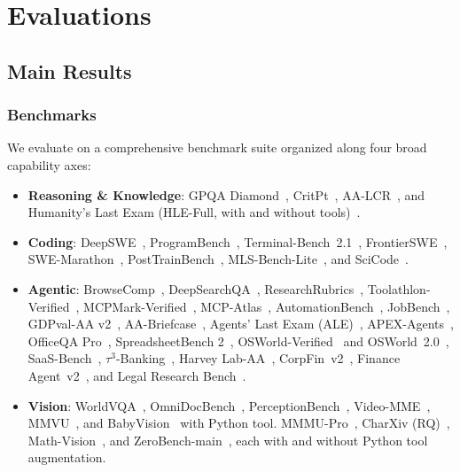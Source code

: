 \section{Evaluations}
\subsection{Main Results}
\subsubsection{Benchmarks}
We evaluate  on a comprehensive benchmark suite organized along four broad capability axes:
\begin{itemize}[leftmargin=12pt]
  \item \textbf{Reasoning \& Knowledge}: GPQA Diamond~\citep{rein2024gpqa}, CritPt~\citep{artificialanalysis}, AA-LCR~\citep{aalcr}, and Humanity's Last Exam (HLE-Full, with and without tools)~\citep{phan2025humanitysexam}.
  \item \textbf{Coding}: DeepSWE~\citep{deepswe}, ProgramBench~\citep{programbench}, Terminal-Bench~2.1~\citep{merrill2026terminal}, FrontierSWE~\citep{frontierswe}, SWE-Marathon~\citep{swemarathon}, PostTrainBench~\citep{posttrainbench}, MLS-Bench-Lite~\citep{lyu2026mlsbench}, and SciCode~\citep{tian2024scicode,artificialanalysis}.
  \item \textbf{Agentic}: BrowseComp~\citep{wei2025browsecomp}, DeepSearchQA~\citep{vedula2025deepsearchqa}, ResearchRubrics~\citep{sharma2026researchrubrics}, Toolathlon-Verified~\citep{li2025toolathlon}, MCPMark-Verified~\citep{wu2025mcpmark}, MCP-Atlas~\citep{bandi2026mcpatlas}, AutomationBench~\citep{shepard2026automationbench}, JobBench~\citep{li2026jobbench}, GDPval-AA v2~\citep{patwardhan2025gdpval}, AA-Briefcase~\citep{artificialanalysis,aabriefcase}, Agents' Last Exam (ALE)~\citep{agentslastexam, sun2026agentsexam}, APEX-Agents~\citep{vidgen2026apexagents}, OfficeQA Pro~\citep{opsahlong2026officeqa}, SpreadsheetBench 2~\citep{zhu2026spreadsheetbench2}, OSWorld-Verified~\citep{xie2024osworld} and OSWorld~2.0~\citep{yuan2026osworld20benchmarkingcomputeruse}, SaaS-Bench~\citep{shi2026saasbench}, $\tau^3$-Banking~\citep{tau3banking,artificialanalysis}, Harvey Lab-AA~\citep{artificialanalysis, harveylabbench}, CorpFin~v2~\citep{valscorpfin}, Finance Agent~v2~\citep{valsfinanceagent}, and Legal Research Bench~\citep{valsailegalresearch}.
  \item \textbf{Vision}: WorldVQA~\citep{worldvqa}, OmniDocBench~\citep{ouyang2025omnidocbench}, PerceptionBench~\citep{perceptionbench}, Video-MME~\citep{fu2024videomme}, MMVU~\citep{zhao2025mmvu}, and BabyVision~\citep{chen2026babyvision} with Python tool. MMMU-Pro~\citep{yue2024mmmupro}, CharXiv (RQ)~\citep{wang2024charxiv}, Math-Vision~\citep{wang2024mathvision}, and ZeroBench-main~\citep{roberts2025zerobench}, each with and without Python tool augmentation. 
\end{itemize}

